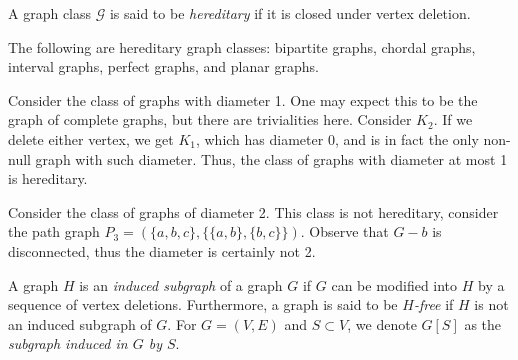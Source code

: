 \begin{definition}[Hereditary]
  A graph class $\mathcal G$ is said to be \emph{hereditary} if it is closed under vertex deletion.
\end{definition}

\begin{example}
  The following are hereditary graph classes: bipartite graphs, chordal graphs, interval graphs, perfect graphs, and planar graphs.
\end{example}

\begin{example}
  Consider the class of graphs with diameter 1. One may expect this to be the graph of complete graphs, but there are trivialities here. Consider $K_2$. If we delete either vertex, we get $K_1$, which has diameter 0, and is in fact the only non-null graph with such diameter. Thus, the class of graphs with diameter at most 1 is hereditary.
\end{example}

\begin{example}
  Consider the class of graphs of diameter 2. This class is not hereditary, consider the path graph $P_3=(\{a,b,c\}, \{\{a,b\}, \{b,c\}\})$. Observe that $G-b$ is disconnected, thus the diameter is certainly not 2.
\end{example}

\begin{definition}
  A graph $H$ is an \emph{induced subgraph} of a graph $G$ if $G$ can be modified into $H$ by a sequence of vertex deletions. Furthermore, a graph is said to be \emph{$H$-free} if $H$ is not an induced subgraph of $G$. For $G = (V,E)$ and $S \subset V$, we denote $G[S]$ as the \emph{subgraph induced in $G$ by $S$}.
\end{definition}

